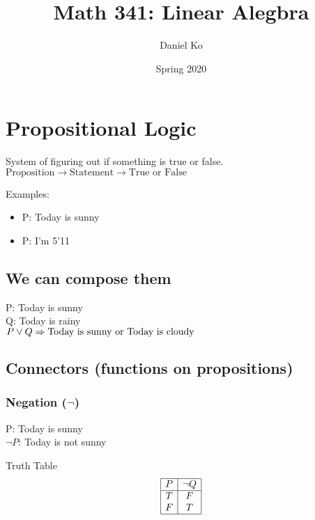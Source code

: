 \documentclass[a4paper]{article}
\title{Math 341: Linear Alegbra}
\author{Daniel Ko}
\date{Spring 2020}
\begin{document}
\maketitle


\section{Propositional Logic}

System of figuring out if something is true or false.
\\
$\text{Proposition} \rightarrow \text{Statement} \rightarrow \text{True or False}$

Examples:
\begin{itemize}
	\item P: Today is sunny 
	\item P: I'm 5'11
\end{itemize}

\subsection{We can compose them}
P: Today is sunny
\\
Q: Today is rainy
\\
$P \lor Q \Rightarrow \hbox{Today is sunny or Today is cloudy}$

\subsection{Connectors (functions on propositions)}

\subsubsection{Negation ($\lnot$)}

P: Today is sunny
\\
$\lnot P$: Today is not sunny

\begin{center}
	Truth Table
	\begin{displaymath}
		\begin{array}{|c|c|}
			\hline
			P & \lnot Q \\ 
			\hline
			T & F \\
			F & T \\
			\hline
		\end{array}
	\end{displaymath}
\end{center}
\end{document}
